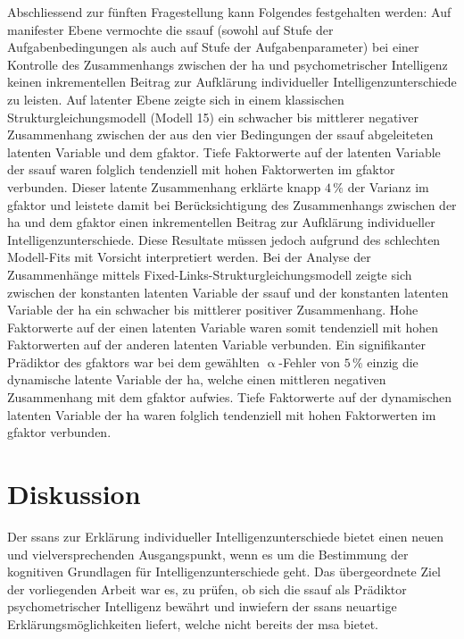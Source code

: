 \documentclass[11pt, twoside, a4paper]{book}		%
\begin{document}
Abschliessend zur fünften Fragestellung kann Folgendes festgehalten werden: 
Auf manifester Ebene vermochte die \gls{ssauf} (sowohl auf Stufe der Aufgabenbedingungen als auch auf Stufe der Aufgabenparameter) bei einer Kontrolle des Zusammenhangs zwischen der \gls{ha} und psychometrischer Intelligenz keinen inkrementellen Beitrag zur Aufklärung individueller Intelligenzunterschiede zu leisten.
Auf latenter Ebene zeigte sich in einem klassischen Strukturgleichungsmodell (Modell 15) ein schwacher bis mittlerer negativer Zusammenhang zwischen der aus den vier Bedingungen der \gls{ssauf} abgeleiteten latenten Variable und dem \gls{gfaktor}. Tiefe Faktorwerte auf der latenten Variable der \gls{ssauf} waren folglich tendenziell mit hohen Faktorwerten im \gls{gfaktor} verbunden. 
Dieser latente Zusammenhang erklärte knapp $4\,\%$ der Varianz im \gls{gfaktor} und leistete damit bei Berücksichtigung des Zusammenhangs zwischen der \gls{ha} und dem \gls{gfaktor} einen inkrementellen Beitrag zur Aufklärung individueller Intelligenzunterschiede. Diese Resultate müssen jedoch aufgrund des schlechten Modell-Fits mit Vorsicht interpretiert werden.
Bei der Analyse der Zusammenhänge mittels Fixed-Links-Struk\-tur\-glei\-chungs\-mo\-dell zeigte sich zwischen der konstanten latenten Variable der \gls{ssauf} und der konstanten latenten Variable der \gls{ha} ein schwacher bis mittlerer positiver Zusammenhang. Hohe Faktorwerte auf der einen latenten Variable waren somit tendenziell mit hohen Faktorwerten auf der anderen latenten Variable verbunden. Ein signifikanter Prädiktor des \gls{gfaktor}s war bei dem gewählten $\upalpha$-Fehler von $5\,\%$ einzig die dynamische latente Variable der \gls{ha}, welche einen mittleren negativen Zusammenhang mit dem \gls{gfaktor} aufwies. Tiefe Faktorwerte auf der dynamischen latenten Variable der \gls{ha} waren folglich tendenziell mit hohen Faktorwerten im \gls{gfaktor} verbunden.











\chapter{Diskussion \label{cha:Diskussion}}

Der \gls{ssans} zur Erklärung individueller Intelligenzunterschiede \citep{Melnick2013} bietet einen neuen und vielversprechenden Ausgangspunkt, wenn es um die Bestimmung der kognitiven Grundlagen für Intelligenzunterschiede geht.
Das übergeordnete Ziel der vorliegenden Arbeit war es, zu prüfen, ob sich die \gls{ssauf} als Prädiktor psychometrischer Intelligenz bewährt und inwiefern der \gls{ssans} \citep{Melnick2013} neuartige Erklärungsmöglichkeiten liefert, welche nicht bereits der \gls{msa} \citep[z.~B.][]{Deary2000a, Jensen1982a, Jensen1982b, Jensen2006, Vernon1983} bietet. 
\end{document}

